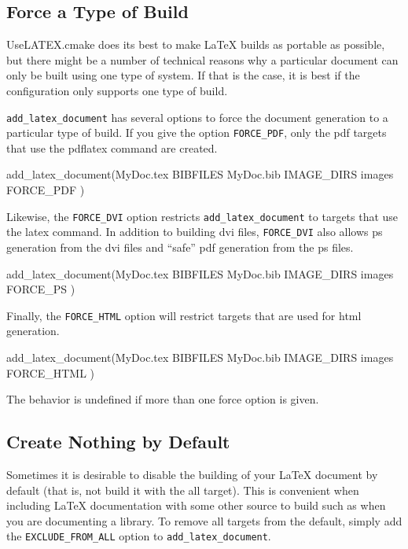 \documentclass{article}
\newcommand*{\textfile}[1]{\textsf{#1}}
\newcommand*{\textprog}[1]{\textfile{#1}}
\newcommand*{\textcmake}[1]{\texttt{#1}}
\newcommand*{\textmaketarget}[1]{#1}
\newcommand*{\UseLATEX}{\textfile{UseLATEX.cmake}\xspace}
\newcommand*{\latex}{\LaTeX\xspace}
\newcommand*{\ald}{\textcmake{add\_latex\_document}\xspace}
\begin{document}
  \subsection{Force a Type of Build}
  \label{sec:ForceATypeOfBuild}

  \UseLATEX does its best to make \latex builds as portable as possible,
  but there might be a number of technical reasons why a particular
  document can only be built using one type of system. If that is the case,
  it is best if the configuration only supports one type of build.

  \ald has several options to force the document generation to a particular
  type of build. If you give the option \textcmake{FORCE\_PDF}, only the
  pdf targets that use the \textprog{pdflatex} command are created.

  \begin{CodeListing}
add_latex_document(MyDoc.tex
  BIBFILES MyDoc.bib
  IMAGE_DIRS images
  FORCE_PDF
  )
  \end{CodeListing}

  Likewise, the \textcmake{FORCE\_DVI} option restricts \ald to targets that
  use the \textprog{latex} command. In addition to building dvi files,
  \textcmake{FORCE\_DVI} also allows ps generation from the dvi files and
  ``safe'' pdf generation from the ps files.

  \begin{CodeListing}
add_latex_document(MyDoc.tex
  BIBFILES MyDoc.bib
  IMAGE_DIRS images
  FORCE_PS
  )
  \end{CodeListing}

  Finally, the \textcmake{FORCE\_HTML} option will restrict targets that are
  used for html generation.

  \begin{CodeListing}
add_latex_document(MyDoc.tex
  BIBFILES MyDoc.bib
  IMAGE_DIRS images
  FORCE_HTML
  )
  \end{CodeListing}

  The behavior is undefined if more than one force option is given.

  \subsection{Create Nothing by Default}
  \label{sec:CreateNothingByDefault}

  Sometimes it is desirable to disable the building of your \latex document
  by default (that is, not build it with the \textmaketarget{all} target).
  This is convenient when including \latex documentation with some other
  source to build such as when you are documenting a library.  To remove
  all targets from the default, simply add the
  \textcmake{EXCLUDE\_FROM\_ALL} option to \ald.
\end{document}
